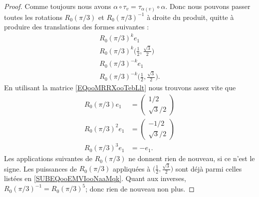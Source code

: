 \begin{proof}
	Comme toujours nous avons \( \alpha\circ\tau_v=\tau_{\alpha(v)}\circ \alpha\). Donc nous pouvons passer toutes les rotations \( R_0(\pi/3)\) et \( R_0(\pi/3)^{-1}\) à droite du produit, quitte à produire des translations des formes suivantes :
	\begin{subequations}
		\begin{align}
			R_0(\pi/3)^ke_1                                              \\
			R_0(\pi/3)^k\big( \frac{ 1 }{2},\frac{ \sqrt{ 3 } }{2} \big) \\
			R_0(\pi/3)^{-k}e_1                                           \\
			R_0(\pi/3)^{-k}\big( \frac{ 1 }{2},\frac{ \sqrt{ 3 } }{2} \big).
		\end{align}
	\end{subequations}
	En utilisant la matrice \eqref{EQooMRRXooTebLlt} nous trouvons assez vite que
	\begin{subequations}        \label{SUBEQooEMVIooNaaMqk}
		\begin{align}
			R_0(\pi/3)e_1   & =\begin{pmatrix}
				1/2 \\
				\sqrt{ 3 }/2
			\end{pmatrix} \\
			R_0(\pi/3)^2e_1 & =\begin{pmatrix}
				-1/2 \\
				\sqrt{ 3 }/2
			\end{pmatrix} \\
			R_0(\pi/3)^3e_1 & =-e_1.
		\end{align}
	\end{subequations}
	Les applications suivantes de \( R_0(\pi/3)\) ne donnent rien de nouveau, si ce n'est le signe. Les puissances de \( R_0(\pi/3)\) appliquées à \( \big( \frac{ 1 }{2},\frac{ \sqrt{ 3 } }{2} \big)\) sont déjà parmi celles listées en \eqref{SUBEQooEMVIooNaaMqk}. Quant aux inverses, \( R_0(\pi/3)^{-1}=R_0(\pi/3)^5\); donc rien de nouveau non plus.


\end{proof}
